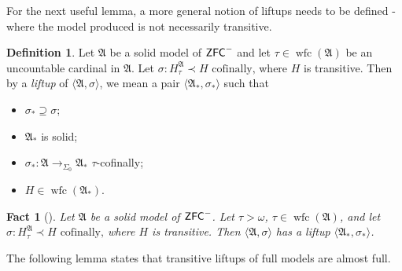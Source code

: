\documentclass{amsart}
\newtheorem{fact}[theorem]{Fact}
\theoremstyle{definition}
\newtheorem{definition}[theorem]{Definition}
\theoremstyle{remark}
\newcommand{\ZFC}{\textup{\ensuremath{\textsf{ZFC}}}}
\DeclareMathOperator{\wfc}{wfc}
\newcommand{\To}{\longrightarrow}
\begin{document}
For the next useful lemma, a more general notion of liftups needs to be defined - where the model produced is not necessarily transitive.
\begin{definition} Let $\mathfrak A$ be a solid model of $\ZFC^-$ and let $\tau \in \wfc(\mathfrak A)$ be an uncountable cardinal in $\mathfrak A$. Let $\sigma: H_{\tau}^\mathfrak A \prec H \text{ cofinally,}$ where $H$ is transitive. Then by a \textit{liftup} of $\langle \mathfrak A, \sigma\rangle$, we mean a pair $\langle {\mathfrak A}_*, \sigma_* \rangle$ such that 
\begin{itemize}
	\item $\sigma_* \supseteq \sigma$;
	\item ${\mathfrak A}_*$ is solid;
	\item $\sigma_*: \mathfrak A \To_{\Sigma_0} {\mathfrak A}_*$ $\tau$-cofinally;
	\item $H \in \wfc({\mathfrak A}_*)$. \qedhere
\end{itemize}
\end{definition}
\begin{fact}[{\cite[Lemma 3.3]{Jensen:2014}}]\label{fact:solidliftup} Let $\mathfrak A$ be a solid model of $\ZFC^-$. Let $\tau > \omega$, $\tau \in \wfc(\mathfrak A)$, and let $\sigma: H_{\tau}^{\mathfrak A} \prec H \text{ cofinally,}$  where $H$ is transitive. Then $\langle \mathfrak A, \sigma \rangle$ has a liftup $\langle \mathfrak A_*, \sigma_* \rangle$.
\end{fact}

The following lemma states that transitive liftups of full models are almost full.
\end{document}
